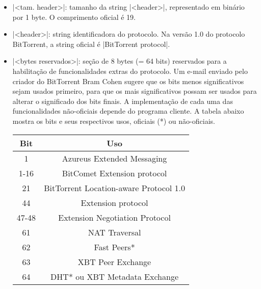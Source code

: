 \begin{itemize}
    \item \bverb|<tam. header>|: tamanho da string \bverb|<header>|,
        representado em binário por 1 byte. O comprimento oficial é 19.

    \item \bverb|<header>|: \gls*{string} identificadora do protocolo. Na versão 1.0 do
        protocolo BitTorrent, a \gls*{string} oficial é \sverb|BitTorrent protocol|.

    \item \bverb|<bytes reservados>|: seção de 8 bytes (= 64 bits) reservados para a
        habilitação de funcionalidades extras do protocolo. Um e-mail enviado pelo
        criador do BitTorrent Bram Cohen \cite{wikitheory:reserved-bytes} sugere que os
        bits menos significativos sejam usados primeiro, para que os mais significativos
        possam ser usados para alterar o significado dos bits finais. A implementação de
        cada uma das funcionalidades não-oficiais depende do programa cliente. A tabela
        abaixo mostra os bits e seus respectivos usos, oficiais (*) ou não-oficiais.

        \begin{center}
            \begin{tabular}{ | c | c |}
            \hline
            \textbf{Bit} & \textbf{Uso}                         \\ \hline
            1       & Azureus Extended Messaging                \\ \hline
            1-16    & BitComet Extension protocol               \\ \hline
            21      & BitTorrent Location-aware Protocol 1.0    \\ \hline
            44      & Extension protocol                        \\ \hline
            47-48   & Extension Negotiation Protocol            \\ \hline
            61      & NAT Traversal                             \\ \hline
            62      & Fast Peers*                               \\ \hline
            63      & XBT Peer Exchange                         \\ \hline
            64      & DHT* ou XBT Metadata Exchange             \\ \hline
            \end{tabular}
        \end{center}


\end{itemize}
